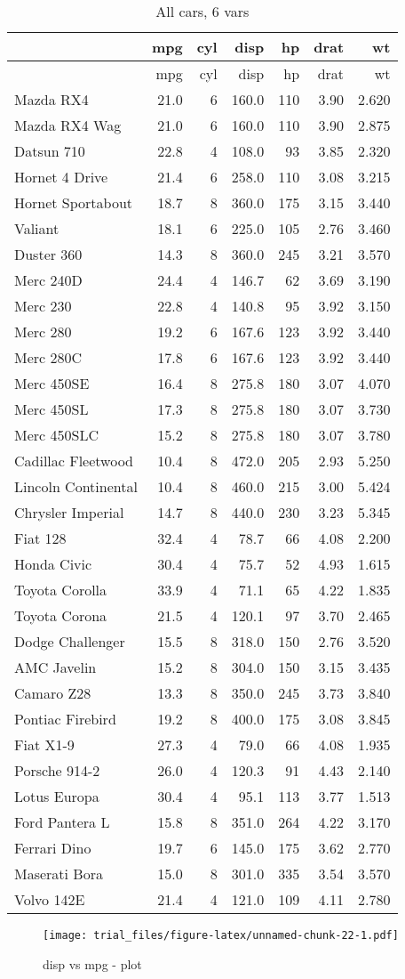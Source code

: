 \documentclass[]{article}
\begin{document}
\begin{longtable}[]{@{}lrrrrrr@{}}
\caption{All cars, 6 vars}\tabularnewline
\toprule
& mpg & cyl & disp & hp & drat & wt\tabularnewline
\midrule
\endfirsthead
\toprule
& mpg & cyl & disp & hp & drat & wt\tabularnewline
\midrule
\endhead
Mazda RX4 & 21.0 & 6 & 160.0 & 110 & 3.90 & 2.620\tabularnewline
Mazda RX4 Wag & 21.0 & 6 & 160.0 & 110 & 3.90 & 2.875\tabularnewline
Datsun 710 & 22.8 & 4 & 108.0 & 93 & 3.85 & 2.320\tabularnewline
Hornet 4 Drive & 21.4 & 6 & 258.0 & 110 & 3.08 & 3.215\tabularnewline
Hornet Sportabout & 18.7 & 8 & 360.0 & 175 & 3.15 & 3.440\tabularnewline
Valiant & 18.1 & 6 & 225.0 & 105 & 2.76 & 3.460\tabularnewline
Duster 360 & 14.3 & 8 & 360.0 & 245 & 3.21 & 3.570\tabularnewline
Merc 240D & 24.4 & 4 & 146.7 & 62 & 3.69 & 3.190\tabularnewline
Merc 230 & 22.8 & 4 & 140.8 & 95 & 3.92 & 3.150\tabularnewline
Merc 280 & 19.2 & 6 & 167.6 & 123 & 3.92 & 3.440\tabularnewline
Merc 280C & 17.8 & 6 & 167.6 & 123 & 3.92 & 3.440\tabularnewline
Merc 450SE & 16.4 & 8 & 275.8 & 180 & 3.07 & 4.070\tabularnewline
Merc 450SL & 17.3 & 8 & 275.8 & 180 & 3.07 & 3.730\tabularnewline
Merc 450SLC & 15.2 & 8 & 275.8 & 180 & 3.07 & 3.780\tabularnewline
Cadillac Fleetwood & 10.4 & 8 & 472.0 & 205 & 2.93 &
5.250\tabularnewline
Lincoln Continental & 10.4 & 8 & 460.0 & 215 & 3.00 &
5.424\tabularnewline
Chrysler Imperial & 14.7 & 8 & 440.0 & 230 & 3.23 & 5.345\tabularnewline
Fiat 128 & 32.4 & 4 & 78.7 & 66 & 4.08 & 2.200\tabularnewline
Honda Civic & 30.4 & 4 & 75.7 & 52 & 4.93 & 1.615\tabularnewline
Toyota Corolla & 33.9 & 4 & 71.1 & 65 & 4.22 & 1.835\tabularnewline
Toyota Corona & 21.5 & 4 & 120.1 & 97 & 3.70 & 2.465\tabularnewline
Dodge Challenger & 15.5 & 8 & 318.0 & 150 & 2.76 & 3.520\tabularnewline
AMC Javelin & 15.2 & 8 & 304.0 & 150 & 3.15 & 3.435\tabularnewline
Camaro Z28 & 13.3 & 8 & 350.0 & 245 & 3.73 & 3.840\tabularnewline
Pontiac Firebird & 19.2 & 8 & 400.0 & 175 & 3.08 & 3.845\tabularnewline
Fiat X1-9 & 27.3 & 4 & 79.0 & 66 & 4.08 & 1.935\tabularnewline
Porsche 914-2 & 26.0 & 4 & 120.3 & 91 & 4.43 & 2.140\tabularnewline
Lotus Europa & 30.4 & 4 & 95.1 & 113 & 3.77 & 1.513\tabularnewline
Ford Pantera L & 15.8 & 8 & 351.0 & 264 & 4.22 & 3.170\tabularnewline
Ferrari Dino & 19.7 & 6 & 145.0 & 175 & 3.62 & 2.770\tabularnewline
Maserati Bora & 15.0 & 8 & 301.0 & 335 & 3.54 & 3.570\tabularnewline
Volvo 142E & 21.4 & 4 & 121.0 & 109 & 4.11 & 2.780\tabularnewline
\bottomrule
\end{longtable}

\begin{figure}[htbp]
\centering
\texttt{[image: trial\_files/figure-latex/unnamed-chunk-22-1.pdf]}
\caption{disp vs mpg - plot}
\end{figure}
\end{document}
